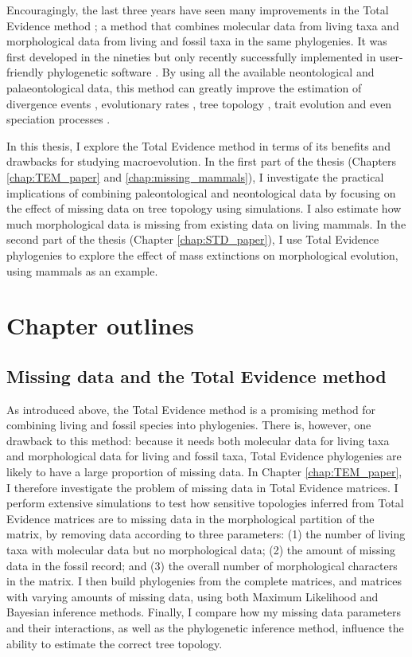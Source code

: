 Encouragingly, the last three years have seen many improvements in the Total Evidence method \citep{ronquista2012,Slater2012MEE,Wood01032013,schragocombining2013,beckancient2014,Arcila2015131,Dembo2015}; a method that combines molecular data from living taxa and morphological data from living and fossil taxa in the same phylogenies.
It was first developed in the nineties \citep{eernissetaxonomic1993} but only recently successfully implemented in user-friendly phylogenetic software \citep{Ronquist2012mrbayes,BEAST2}.
By using all the available neontological and palaeontological data, this method can greatly improve the estimation of divergence events \citep{ronquista2012}, evolutionary rates \citep{beckancient2014}, tree topology \citep{Dembo2015}, trait evolution \citep{Slater2012MEE} and even speciation processes \citep{Wood01032013}.

In this thesis, I explore the Total Evidence method in terms of its benefits and drawbacks for studying macroevolution.
In the first part of the thesis (Chapters \ref{chap:TEM_paper} and \ref{chap:missing_mammals}), I investigate the practical implications of combining paleontological and neontological data by focusing on the effect of missing data on tree topology using simulations. I also estimate how much morphological data is missing from existing data on living mammals.
In the second part of the thesis (Chapter \ref{chap:STD_paper}), I use Total Evidence phylogenies to explore the effect of mass extinctions on morphological evolution, using mammals as an example.

\section{Chapter outlines}
\subsection{Missing data and the Total Evidence method}
As introduced above, the Total Evidence method is a promising method for combining living and fossil species into phylogenies.
There is, however, one drawback to this method: because it needs both molecular data for living taxa and morphological data for living and fossil taxa, Total Evidence phylogenies are likely to have a large proportion of missing data.
In Chapter \ref{chap:TEM_paper}, I therefore investigate the problem of missing data in Total Evidence matrices.
I perform extensive simulations to test how sensitive topologies inferred from Total Evidence matrices are to missing data in the morphological partition of the matrix, by removing data according to three parameters: (1) the number of living taxa with molecular data but no morphological data; (2) the amount of missing data in the fossil record; and (3) the overall number of morphological characters in the matrix.
I then build phylogenies from the complete matrices, and matrices with varying amounts of missing data, using both Maximum Likelihood and Bayesian inference methods.
Finally, I compare how my missing data parameters and their interactions, as well as the phylogenetic inference method, influence the ability to estimate the correct tree topology.

